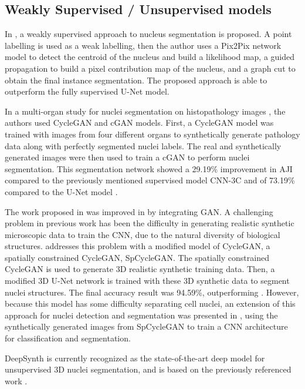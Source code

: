 \subsection{Weakly Supervised / Unsupervised models}

In \cite{weakly:GAN}, a weakly supervised approach to nucleus segmentation is proposed. A point labelling is used as a weak labelling, then the author uses a Pix2Pix network model to detect the centroid of the nucleus and build a likelihood map, a guided propagation to build a pixel contribution map of the nucleus, and a graph cut to obtain the final instance segmentation. The proposed approach is able to outperform the fully supervised U-Net \cite{Unet:2D} model.

In a multi-organ study for nuclei segmentation on histopathology images \cite{cGAN:cycleGAN}, the authors used CycleGAN and \ac{cGAN} models. First, a CycleGAN model was trained with images from four different organs to synthetically generate pathology data along with perfectly segmented nuclei labels. The real and synthetically generated images were then used to train a \ac{cGAN} to perform nuclei segmentation. This segmentation network showed a 29.19\% improvement in \ac{AJI} compared to the previously mentioned supervised model \ac{CNN}-3C \cite{CNN3} and of 73.19\% compared to the U-Net model \cite{Unet:2D}.


The work proposed in \cite{SOTA:3DCNN} was improved in \cite{3D:CycleGAN} by integrating \ac{GAN}. A challenging problem in previous work has been the difficulty in generating realistic synthetic microscopic data to train the \ac{CNN}, due to the natural diversity of biological structures. \citet{3D:CycleGAN} addresses this problem with a modified model of CycleGAN, a spatially constrained CycleGAN, SpCycleGAN. The spatially constrained CycleGAN is used to generate \ac{3D} realistic synthetic training data. Then, a modified \ac{3D} U-Net network is trained with these \ac{3D} synthetic data to segment nuclei structures. The final accuracy result was 94.59\%, outperforming \cite{SOTA:3DCNN}. However, because this model has some difficulty separating cell nuclei, an extension of this approach for nuclei detection and segmentation was presented in \cite{detection:3D}, using the synthetically generated images from SpCycleGAN to train a \ac{CNN} architecture for classification and segmentation.

DeepSynth \cite{deepsynth} is currently recognized as the state-of-the-art deep model for unsupervised \ac{3D} nuclei segmentation, and is based on the previously referenced work \cite{2dplus,SOTA:3DCNN,3D:CycleGAN}.

